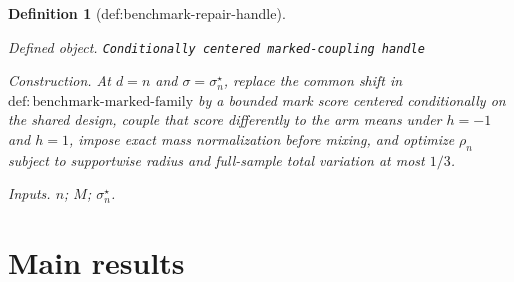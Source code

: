 \documentclass{article}
\newtheorem{definition}{Definition}
\begin{document}
\begin{definition}[def:benchmark-repair-handle]\label{def:benchmark-repair-handle}
\par\smallskip\noindent\emph{Defined object.} \texttt{Conditionally centered marked-\allowbreak{}coupling handle}
\par\smallskip\noindent\emph{Construction.} At \(d=n\) and \(\sigma=\sigma_n^\star\), replace the common shift in \(\mathrm{def:benchmark\text{-}marked\text{-}family}\) by a bounded mark score centered conditionally on the shared design, couple that score differently to the arm means under \(h=-1\) and \(h=1\), impose exact mass normalization before mixing, and optimize \(\rho_n\) subject to supportwise radius and full-sample total variation at most \(1/3\).
\par\smallskip\noindent\emph{Inputs.} \(n\); \(M\); \(\sigma_n^\star\).
\end{definition}

\section{Main results}
\end{document}
